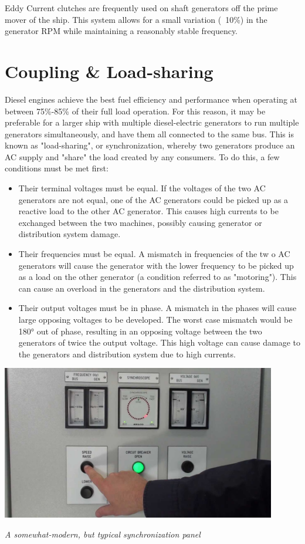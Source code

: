 \documentclass[11pt,a4paper]{article}
\begin{document}
Eddy Current clutches are frequently used on shaft generators off the prime mover of the ship. This system allows for a small variation (~10\%) in the generator RPM while maintaining a reasonably stable frequency.
\section{Coupling \& Load-sharing}
Diesel engines achieve the best fuel efficiency and performance when operating at between 75\%-85\% of their full load operation. For this reason, it may be preferable for a larger ship with multiple diesel-electric generators to run multiple generators simultaneously, and have them all connected to the same bus. This is known as "load-sharing", or synchronization, whereby two generators produce an AC supply and "share" the load created by any consumers. To do this, a few conditions must be met first:
\begin{itemize}
\item Their terminal voltages must be equal.   If the voltages of the two AC generators are not equal, one of the AC generators could be picked up as a reactive load to the other AC generator.  This causes high currents to be exchanged between the two machines, possibly causing generator or distribution system damage.

\item Their frequencies must be equal.   A mismatch in frequencies of the tw  o AC generators will cause the generator with the lower frequency to be picked up as a load on the other generator  (a  condition  referred  to  as  "motoring").    This  can  cause  an  overload  in  the generators and the distribution system.

\item Their  output  voltages  must  be  in  phase.    A  mismatch  in  the  phases  will  cause  large opposing  voltages  to  be  developed.    The  worst  case  mismatch  would  be  180°  out  of phase, resulting in an opposing voltage between the two generators of twice the output voltage.   This high voltage can cause damage to the generators and distribution system due to high currents.\cite{e10}
\end{itemize}

\begin{center}
\includegraphics[width=12cm]{sync.jpg}\par
\textit{A somewhat-modern, but typical synchronization panel}
\end{center}
\end{document}
